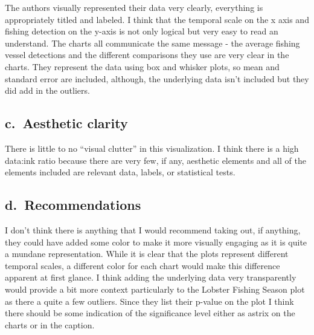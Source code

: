 \documentclass[
  letterpaper,
  DIV=11,
  numbers=noendperiod]{scrartcl}
\begin{document}
The authors visually represented their data very clearly, everything is
appropriately titled and labeled. I think that the temporal scale on the
x axis and fishing detection on the y-axis is not only logical but very
easy to read an understand. The charts all communicate the same message
- the average fishing vessel detections and the different comparisons
they use are very clear in the charts. They represent the data using box
and whisker plots, so mean and standard error are included, although,
the underlying data isn't included but they did add in the outliers.

\subsection{c.~Aesthetic clarity}\label{c.-aesthetic-clarity}

There is little to no ``visual clutter'' in this visualization. I think
there is a high data:ink ratio because there are very few, if any,
aesthetic elements and all of the elements included are relevant data,
labels, or statistical tests.

\subsection{d.~Recommendations}\label{d.-recommendations}

I don't think there is anything that I would recommend taking out, if
anything, they could have added some color to make it more visually
engaging as it is quite a mundane representation. While it is clear that
the plots represent different temporal scales, a different color for
each chart would make this difference apparent at first glance. I think
adding the underlying data very transparently would provide a bit more
context particularly to the Lobster Fishing Season plot as there a quite
a few outliers. Since they list their p-value on the plot I think there
should be some indication of the significance level either as astrix on
the charts or in the caption.
\end{document}
